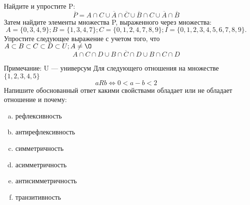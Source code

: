 \documentclass[10pt]{exam}
\begin{document}
\begin{questions}
\question
Найдите и упростите P:
\begin{equation*}
\overline{P} = A \cap C \cup \overline{A} \cap \overline{C} \cup \overline{B} \cap C \cup \overline{A} \cap \overline{B}
\end{equation*}
Затем найдите элементы множества P, выраженного через множества:
\begin{equation*}
A = \{0, 3, 4, 9\}; 
B = \{1, 3, 4, 7\};
C = \{0, 1, 2, 4, 7, 8, 9\};
I = \{0, 1, 2, 3, 4, 5, 6, 7, 8, 9\}.
\end{equation*}\question
Упростите следующее выражение с учетом того, что $A\subset B \subset C \subset D \subset U; A \neq \O$
\begin{equation*}
A \cap C  \cap D \cup B \cap \overline{C} \cap D \cup B \cap C \cap D
\end{equation*}

Примечание: U — универсум\question
Для следующего отношения на множестве $\{1, 2, 3, 4, 5\}$ 
\begin{equation*}
aRb \iff 0 < a-b<2
\end{equation*}
Напишите обоснованный ответ какими свойствами обладает или не обладает отношение и почему:   
\begin{enumerate} [a)]\setcounter{enumi}{0}
\item рефлексивность
\item антирефлексивность
\item симметричность
\item асимметричность
\item антисимметричность
\item транзитивность
\end{enumerate}


\end{questions}
\end{document}
